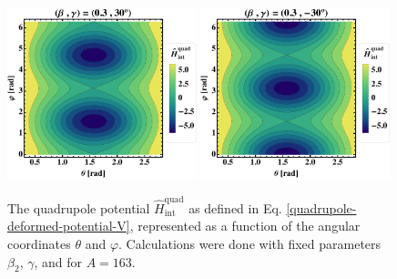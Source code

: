 \begin{figure}
    \centering
    \includegraphics[width=0.49\textwidth]{Chapters/Figures/quadrupole-potentialV-3.pdf}
    \includegraphics[width=0.49\textwidth]{Chapters/Figures/quadrupole-potentialV-4.pdf}
    \caption{The quadrupole potential $\hat{H}_\text{int}^\text{quad}$ as defined in Eq. \ref{quadrupole-deformed-potential-V}, represented as a function of the angular coordinates $\theta$ and $\varphi$. Calculations were done with fixed parameters $\beta_2$, $\gamma$, and for $A=163$.}
    \label{figs-deformed-quadrupole-potential-2}
\end{figure}

